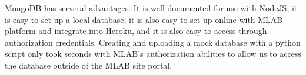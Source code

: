 MongoDB has serveral advantages. It is well documented for use with NodeJS, it is easy to set up a local database, it is also easy to set up online with MLAB platform and integrate into Heroku, and it is also easy to access through authorization credentials. Creating and uploading a mock database with a python script only took seconds with MLAB's authorization abilities to allow us to access the database outside of the MLAB site portal.


